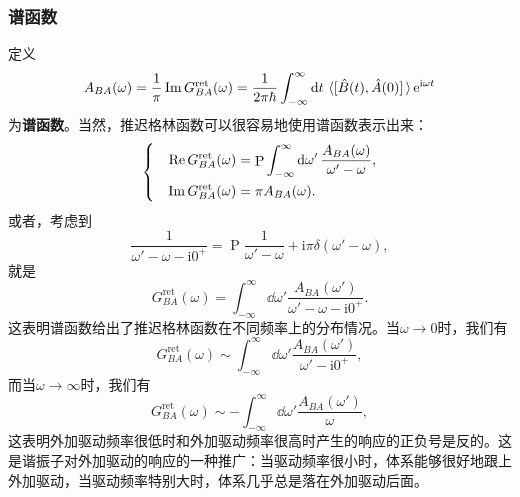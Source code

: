 \documentclass[hyperref, UTF8, a4paper]{ctexart}
\DeclareMathOperator{\primevalue}{P}
\newcommand*{\ii}{\mathrm{i}}
\newcommand*{\ee}{\mathrm{e}}
\newenvironment{bigcase}{\left\{\quad\begin{aligned}}{\end{aligned}\right.}
\begin{document}
\subsubsection{谱函数}\label{sec:spectral-function}
定义
\begin{equation}
    A_{BA}(\omega) = \frac{1}{\pi} \Im G_{BA}^\text{ret}(\omega) = \frac{1}{2 \pi \hbar} \int_{-\infty}^\infty \dd{t} \expval*{\comm*{\hat{B}(t)}{\hat{A}(0)}} \ee^{\ii \omega t}
\end{equation}
为\textbf{谱函数}。当然，推迟格林函数可以很容易地使用谱函数表示出来：
\begin{equation}
    \begin{bigcase}
        \Re G_{BA}^\text{ret}(\omega) &= \primevalue \int_{-\infty}^\infty \dd{\omega'} \frac{A_{BA}(\omega)}{\omega'-\omega} , \\
        \Im G_{BA}^\text{ret}(\omega) &= \pi A_{BA}(\omega).
    \end{bigcase}
\end{equation}
或者，考虑到
\[
    \frac{1}{\omega'-\omega-\ii 0^+} = \primevalue \frac{1}{\omega'-\omega} + \ii \pi \delta(\omega'-\omega),
\]
就是
\begin{equation}
    G_{BA}^\text{ret}(\omega) = \int_{-\infty}^\infty \dd{\omega'} \frac{A_{BA}(\omega')}{\omega' - \omega - \ii 0^+}.
\end{equation}
这表明谱函数给出了推迟格林函数在不同频率上的分布情况。当$\omega\to 0$时，我们有
\[
    G_{BA}^\text{ret}(\omega) \sim \int_{-\infty}^\infty \dd{\omega'} \frac{A_{BA}(\omega')}{\omega' - \ii 0^+},
\]
而当$\omega\to \infty$时，我们有
\[
    G_{BA}^\text{ret}(\omega) \sim - \int_{-\infty}^\infty \dd{\omega'} \frac{A_{BA}(\omega')}{\omega},
\]
这表明外加驱动频率很低时和外加驱动频率很高时产生的响应的正负号是反的。这是谐振子对外加驱动的响应的一种推广：当驱动频率很小时，体系能够很好地跟上外加驱动，当驱动频率特别大时，体系几乎总是落在外加驱动后面。
\end{document}
